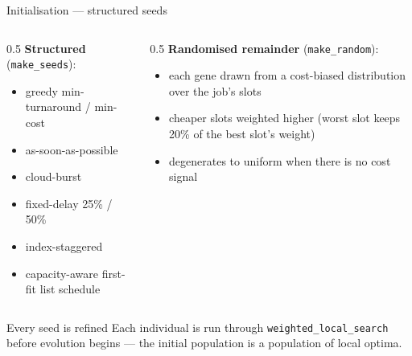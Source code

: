 \documentclass[aspectratio=169,t]{beamer}
\newcommand{\code}[1]{\texttt{#1}}
\begin{document}
\begin{frame}{Initialisation --- structured seeds}
  \begin{columns}[T,onlytextwidth]
    \begin{column}{0.5\textwidth}
      \small
      \textbf{Structured} (\code{make\_seeds}):
      \begin{itemize}
        \item greedy min-turnaround / min-cost
        \item as-soon-as-possible
        \item cloud-burst
        \item fixed-delay 25\% / 50\%
        \item index-staggered
        \item capacity-aware first-fit list schedule
      \end{itemize}
    \end{column}
    \begin{column}{0.5\textwidth}
      \small
      \textbf{Randomised remainder} (\code{make\_random}):
      \begin{itemize}
        \item each gene drawn from a cost-biased distribution over the
          job's slots
        \item cheaper slots weighted higher (worst slot keeps
          20\% of the best slot's weight)
        \item degenerates to uniform when there is no cost signal
      \end{itemize}
    \end{column}
  \end{columns}
  \vspace{1.5mm}
  \begin{alertblock}{Every seed is refined}
    Each individual is run through \code{weighted\_local\_search} before
    evolution begins --- the initial population is a population of local optima.
  \end{alertblock}
\end{frame}
\end{document}
